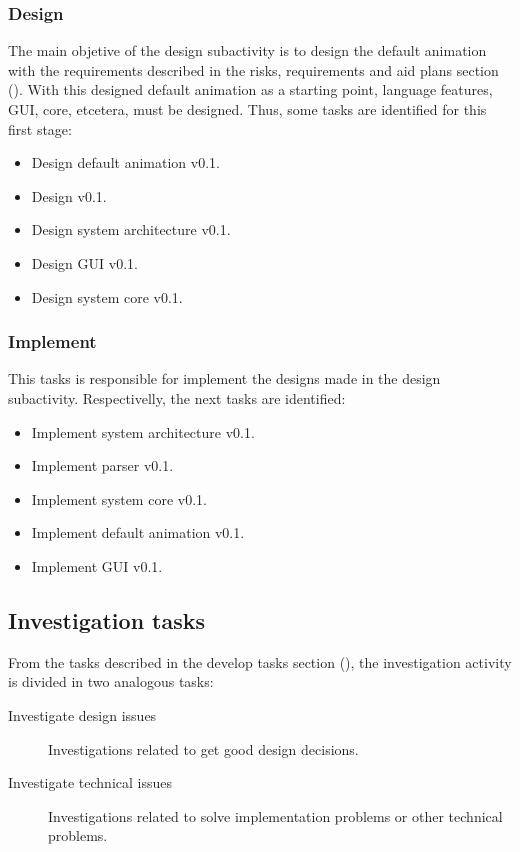 \documentclass[twocolumn, 9pt]{extarticle}
\begin{document}
\subsubsection{Design}
\label{sssec:design}
The main objetive of the design subactivity is to design the
default animation with the requirements described in the risks,
requirements and aid plans section (). With
this designed default animation as a starting point, language
features, GUI, core, etcetera, must be designed. Thus, some tasks are
identified for this first stage:

\begin{itemize}
\item Design \fav default animation v0.1.
\item Design \favpp v0.1.
\item Design \fav system architecture v0.1.
\item Design \fav GUI v0.1.
\item Design \fav system core v0.1.
\end{itemize}

\subsubsection{Implement}
\label{sssec:implement}
This tasks is responsible for implement the designs made in the design
subactivity. Respectivelly, the next tasks are identified:

\begin{itemize}
\item Implement \fav system architecture v0.1.
\item Implement \favpp parser v0.1.
\item Implement \fav system core v0.1.
\item Implement \fav default animation v0.1.
\item Implement \fav GUI v0.1.
\end{itemize}

\subsection{Investigation tasks}
\label{ssec:investigation-tasks}
From the tasks described in the develop tasks section
(), the investigation activity is divided
in two analogous tasks:

\begin{description}
\item[Investigate design issues] Investigations related to get good
  design decisions.
\item[Investigate technical issues] Investigations related to solve
  implementation problems or other technical problems.
\end{description}
\end{document}
